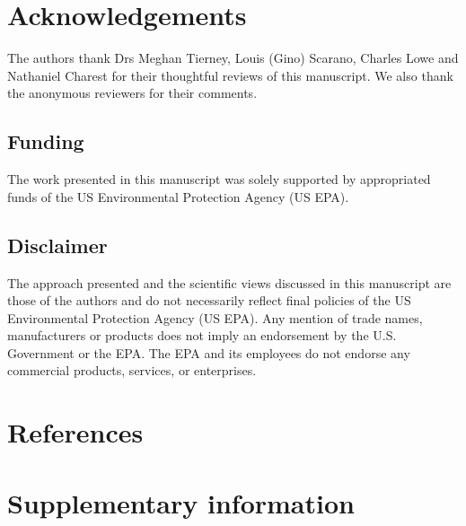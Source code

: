 \documentclass[
  super,
  preprint,
  3p]{elsarticle}
\begin{document}
\hypertarget{acknowledgements}{%
\section{Acknowledgements}\label{acknowledgements}}

The authors thank Drs Meghan Tierney, Louis (Gino) Scarano, Charles Lowe
and Nathaniel Charest for their thoughtful reviews of this manuscript.
We also thank the anonymous reviewers for their comments.

\hypertarget{funding}{%
\subsection*{Funding}\label{funding}}

The work presented in this manuscript was solely supported by
appropriated funds of the US Environmental Protection Agency (US EPA).

\hypertarget{disclaimer}{%
\subsection*{Disclaimer}\label{disclaimer}}

The approach presented and the scientific views discussed in this
manuscript are those of the authors and do not necessarily reflect final
policies of the US Environmental Protection Agency (US EPA). Any mention
of trade names, manufacturers or products does not imply an endorsement
by the U.S. Government or the EPA. The EPA and its employees do not
endorse any commercial products, services, or enterprises.

\hypertarget{references}{%
\section*{References}\label{references}}

\renewcommand{\bibsection}{}


\newpage{}

\newpage
\appendix
\renewcommand{\thefigure}{A\arabic{figure}}
\renewcommand{\thetable}{A\arabic{table}}
\setcounter{figure}{0}
\setcounter{table}{0}

\hypertarget{supplementary-information}{%
\section{Supplementary information}\label{supplementary-information}}
\end{document}
